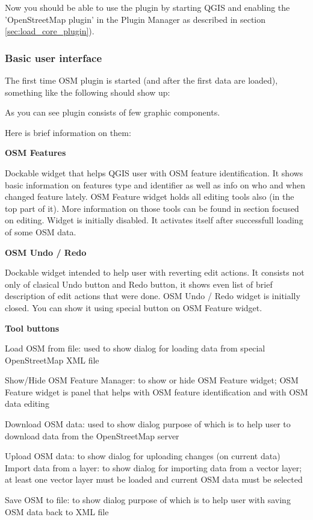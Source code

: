 Now you should be able to use the plugin by starting QGIS and enabling the 
'OpenStreetMap plugin' in the Plugin Manager as described in section 
\ref{sec:load_core_plugin}). 

\subsubsection{Basic user interface}

The first time OSM plugin is started (and after the first data are loaded),
something like the following should show up:

As you can see plugin consists of few graphic components.

Here is brief information on them:

\textbf{OSM Features}

Dockable widget that helps QGIS user with OSM feature identification. It
shows basic information on features type and identifier as well as info on
who and when changed feature lately. OSM Feature widget holds all editing
tools also (in the top part of it). More information on those tools can be
found in section focused on editing. Widget is initially disabled. It
activates itself after successfull loading of some OSM data.

\textbf{OSM Undo / Redo}

Dockable widget intended to help user with reverting edit actions. It
consists not only of clasical Undo button and Redo button, it shows even list
of brief description of edit actions that were done. OSM Undo / Redo widget
is initially closed. You can show it using special button on OSM Feature
widget.

\textbf{Tool buttons}

\begin{description}
\item Load OSM from file: used to show dialog for loading data from special
OpenStreetMap XML file
\item Show/Hide OSM Feature Manager: to show or hide OSM Feature widget; OSM
Feature widget is panel that helps with OSM feature identification and with
OSM data editing
\item Download OSM data: used to show dialog purpose of which is to help user
to download data from the OpenStreetMap server
\item Upload OSM data: to show dialog for uploading changes (on current data) 
Import data from a layer: to show dialog for importing data from a vector
layer; at least one vector layer must be loaded and current OSM data must be
selected
\item Save OSM to file: to show dialog purpose of which is to help user with
saving OSM data back to XML file
\end{description}

